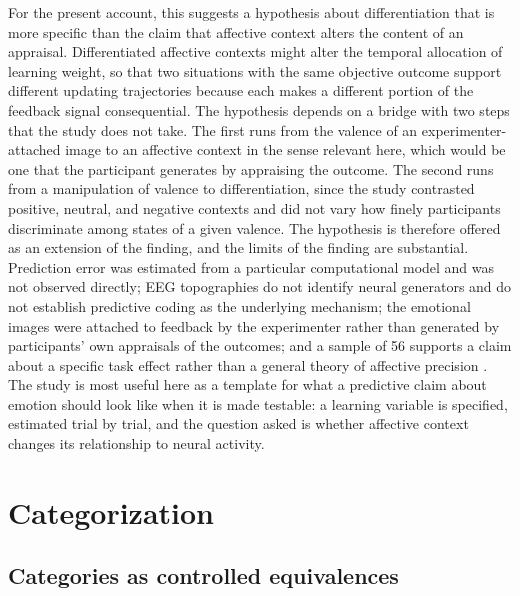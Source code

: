 \documentclass[11pt]{article}
\begin{document}
For the present account, this suggests a hypothesis about differentiation that is more specific than the claim that affective context alters the content of an appraisal. Differentiated affective contexts might alter the temporal allocation of learning weight, so that two situations with the same objective outcome support different updating trajectories because each makes a different portion of the feedback signal consequential. The hypothesis depends on a bridge with two steps that the study does not take. The first runs from the valence of an experimenter-attached image to an affective context in the sense relevant here, which would be one that the participant generates by appraising the outcome. The second runs from a manipulation of valence to differentiation, since the study contrasted positive, neutral, and negative contexts and did not vary how finely participants discriminate among states of a given valence. The hypothesis is therefore offered as an extension of the finding, and the limits of the finding are substantial. Prediction error was estimated from a particular computational model and was not observed directly; EEG topographies do not identify neural generators and do not establish predictive coding as the underlying mechanism; the emotional images were attached to feedback by the experimenter rather than generated by participants' own appraisals of the outcomes; and a sample of 56 supports a claim about a specific task effect rather than a general theory of affective precision \citep{Brown2026}. The study is most useful here as a template for what a predictive claim about emotion should look like when it is made testable: a learning variable is specified, estimated trial by trial, and the question asked is whether affective context changes its relationship to neural activity.

\section{Categorization}\label{sec:categorization}

\subsection{Categories as controlled equivalences}
\end{document}
